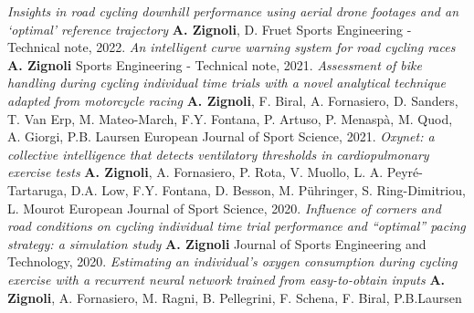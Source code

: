 \documentclass[helvetica,openbib,logo,notitle,flagCMYK,totpages]{europecv}
\begin{document}
\begin{europecv}
{	\emph{Insights in road cycling downhill performance using aerial drone footages and an ‘optimal’ reference trajectory}\newline 
	\textbf{A. Zignoli}, D. Fruet
    \newline 
    Sports Engineering - Technical note, 2022. 
 \newline
	\newline
	\emph{An intelligent curve warning system for road cycling races}\newline 
	\textbf{A. Zignoli}
    \newline 
    Sports Engineering - Technical note, 2021. 
 \newline
	\newline
	\emph{Assessment of bike handling during cycling individual time trials with a novel analytical technique adapted from motorcycle racing}\newline 
	\textbf{A. Zignoli}, F. Biral, A. Fornasiero, D. Sanders, T. Van Erp, M. Mateo-March, F.Y. Fontana, P. Artuso, P. Menaspà, M. Quod, A. Giorgi, P.B. Laursen
 \newline 
    European Journal of Sport Science, 2021. 
 \newline
	\newline
	\emph{Oxynet: a collective intelligence that detects ventilatory thresholds in cardiopulmonary exercise tests}\newline 
	\textbf{A. Zignoli}, A. Fornasiero, P. Rota, V. Muollo, L. A. Peyré-Tartaruga, D.A. Low, F.Y. Fontana, D. Besson, M. Pühringer, S. Ring-Dimitriou, L. Mourot
 \newline 
    European Journal of Sport Science, 2020. 
 \newline
	\newline
	\emph{Influence of corners and road conditions on cycling individual time trial performance and “optimal” pacing strategy: a simulation study}\newline 
	\textbf{A. Zignoli}
 \newline 
    Journal of Sports Engineering and Technology, 2020. 
 \newline
	\newline
	\emph{Estimating an individual's oxygen consumption during cycling exercise with a recurrent neural network trained from easy-to-obtain inputs}\newline 
	\textbf{A. Zignoli}, A. Fornasiero, M. Ragni, B. Pellegrini, F. Schena, F. Biral, P.B.Laursen
 \newline 
}
\end{europecv}
\end{document}
